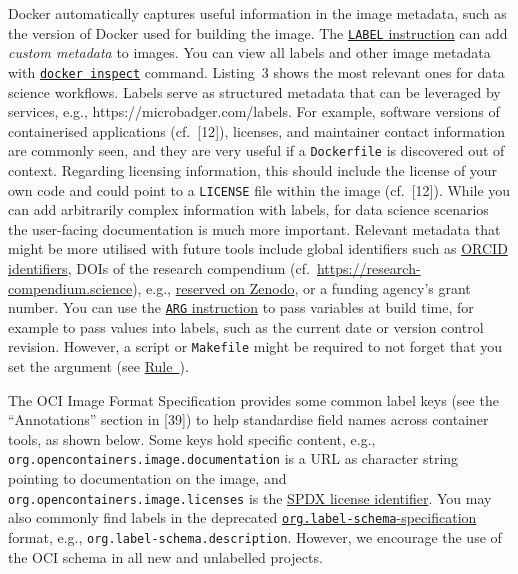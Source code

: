 \documentclass[10pt,letterpaper]{article}
\begin{document}
Docker automatically captures useful information in the image metadata,
such as the version of Docker used for building the image. The
\href{https://docs.docker.com/engine/reference/builder/\#label}{\texttt{LABEL}
instruction} can add \emph{custom metadata} to images. You can view all
labels and other image metadata with
\href{https://docs.docker.com/engine/reference/commandline/inspect/}{\texttt{docker\ inspect}}
command. Listing~3 shows the most relevant ones for data science
workflows. Labels serve as structured metadata that can be leveraged by
services, e.g., https://microbadger.com/labels. For example, software
versions of containerised applications (cf.~{[}12{]}), licenses, and
maintainer contact information are commonly seen, and they are very
useful if a \texttt{Dockerfile} is discovered out of context. Regarding
licensing information, this should include the license of your own code
and could point to a \texttt{LICENSE} file within the image
(cf.~{[}12{]}). While you can add arbitrarily complex information with
labels, for data science scenarios the user-facing documentation is much
more important. Relevant metadata that might be more utilised with
future tools include global identifiers such as
\href{https://orcid.org/}{ORCID identifiers}, DOIs of the research
compendium (cf.~\url{https://research-compendium.science}), e.g.,
\href{https://help.zenodo.org/}{reserved on Zenodo}, or a funding
agency's grant number. You can use the
\href{https://docs.docker.com/engine/reference/builder/\#arg}{\texttt{ARG}
instruction} to pass variables at build time, for example to pass values
into labels, such as the current date or version control revision.
However, a script or \texttt{Makefile} might be required to not forget
that you set the argument (see
\hyperref[{rule:usage}]{Rule~}).

The OCI Image Format Specification provides some common label keys (see
the ``Annotations'' section in {[}39{]}) to help standardise field names
across container tools, as shown below. Some keys hold specific content,
e.g., \texttt{org.opencontainers.image.documentation} is a URL as
character string pointing to documentation on the image, and
\texttt{org.opencontainers.image.licenses} is the
\href{https://spdx.org/licenses/}{SPDX license identifier}. You may also
commonly find labels in the deprecated
\href{http://label-schema.org/rc1/}{\texttt{org.label-schema}-specification}
format, e.g., \texttt{org.label-schema.description}. However, we
encourage the use of the OCI schema in all new and unlabelled projects.
\end{document}
